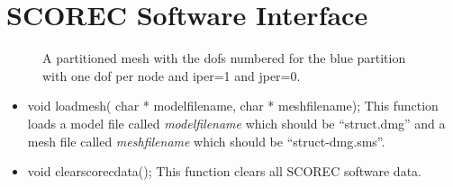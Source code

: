 \appendix
\chapter{SCOREC Software Interface}

\begin{center}
\begin{figure}
\centerline{} %
\caption{A partitioned mesh with the dofs numbered for the blue partition with one dof per node and iper=1 and jper=0.}\label{meshpartition} \end{figure}
\end{center}


\begin{itemize}
\item void loadmesh( char * modelfilename, char * meshfilename); This function
loads a model file called \textit{modelfilename} which should be ``struct.dmg'' 
and a mesh file called \textit{meshfilename} which should be ``struct-dmg.sms''.
\item void clearscorecdata(); This function clears all SCOREC software data.
\end{itemize}


